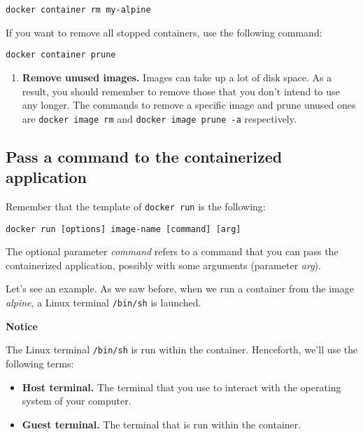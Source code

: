 \documentclass[
]{article}
\providecommand{\tightlist}{%
  \setlength{\itemsep}{0pt}\setlength{\parskip}{0pt}}
\newenvironment{infobox}[1]
  {
  \begin{itemize}
  \renewcommand{\labelitemi}{
    \raisebox{-.7\height}[0pt][0pt]{
      
    }
  }
  \setlength{\fboxsep}{1em}
  \begin{whitebox}
  \item
  }
  {
  \end{whitebox}
  \end{itemize}
  }
\theoremstyle{definition}
\theoremstyle{definition}
\theoremstyle{definition}
\theoremstyle{remark}
\begin{document}
\begin{verbatim}
docker container rm my-alpine
\end{verbatim}

If you want to remove all stopped containers, use the
following command:

\begin{verbatim}
docker container prune
\end{verbatim}

\begin{enumerate}
\def\labelenumi{\arabic{enumi}.}
\setcounter{enumi}{3}
\tightlist
\item
  \textbf{Remove unused images.} Images can take up a lot of disk space.
  As a result, you should remember to remove those that you don't intend to use
  any longer.
  The commands to remove a specific image
  and prune unused ones are \texttt{docker\ image\ rm}
  and \texttt{docker\ image\ prune\ -a} respectively.
\end{enumerate}

\hypertarget{pass-a-command-to-the-containerized-application}{%
\subsection{Pass a command to the containerized application}\label{pass-a-command-to-the-containerized-application}}

Remember that the template of \texttt{docker\ run} is the following:

\begin{verbatim}
docker run [options] image-name [command] [arg]
\end{verbatim}

The optional parameter \emph{command} refers to a command
that you can pass the containerized application, possibly with some arguments
(parameter \emph{arg}).

Let's see an example.
As we saw before, when we run a container from the image \emph{alpine},
a Linux terminal \texttt{/bin/sh} is launched.

\begin{infobox}{warning}

\textbf{Notice}

The Linux terminal \texttt{/bin/sh} is run within the
container.
Henceforth, we'll use the following terms:

\begin{itemize}
\tightlist
\item
  \textbf{Host terminal.} The terminal that you use to
  interact with the operating system of your computer.
\end{itemize}

\begin{itemize}
\tightlist
\item
  \textbf{Guest terminal.} The terminal that is run within
  the container.
\end{itemize}

\end{infobox}
\end{document}
